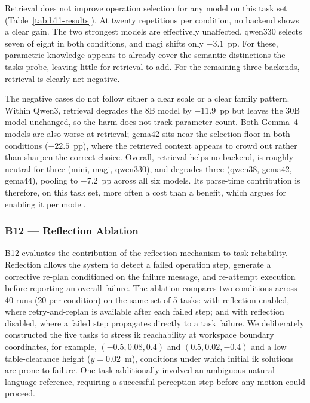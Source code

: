 Retrieval does not improve operation selection for any model on this task set (Table~\ref{tab:b11-results}). At twenty repetitions per condition, no backend shows a clear gain. The two strongest models are effectively unaffected. \gls{qwen330} selects seven of eight in both conditions, and \gls{magi} shifts only $-3.1$~pp. For these, parametric knowledge appears to already cover the semantic distinctions the tasks probe, leaving little for retrieval to add. For the remaining three backends, retrieval is clearly net negative.

The negative cases do not follow either a clear scale or a clear family pattern. Within Qwen3, retrieval degrades the 8B model by $-11.9$~pp but leaves the 30B model unchanged, so the harm does not track parameter count. Both Gemma~4 models are also worse at retrieval; \gls{gema42} sits near the selection floor in both conditions ($-22.5$~pp), where the retrieved context appears to crowd out rather than sharpen the correct choice. Overall, retrieval helps no backend, is roughly neutral for three (\gls{mini}, \gls{magi}, \gls{qwen330}), and degrades three (\gls{qwen38}, \gls{gema42}, \gls{gema44}), pooling to $-7.2$~pp across all six models. Its parse-time contribution is therefore, on this task set, more often a cost than a benefit, which argues for enabling it per model.

\subsubsection{B12 — Reflection Ablation}\label{sec:results-reflection}
B12 evaluates the contribution of the reflection mechanism to task reliability. Reflection allows the system to detect a failed operation step, generate a corrective re-plan conditioned on the failure message, and re-attempt execution before reporting an overall failure. The ablation compares two conditions across 40 runs (20 per condition) on the same set of 5 tasks: with reflection enabled, where retry-and-replan is available after each failed step; and with reflection disabled, where a failed step propagates directly to a task failure. We deliberately constructed the five tasks to stress \gls{ik} reachability at workspace boundary coordinates, for example, $(-0.5, 0.08, 0.4)$ and $(0.5, 0.02, -0.4)$ and a low table-clearance height ($y = 0.02$~m), conditions under which initial \gls{ik} solutions are prone to failure. One task additionally involved an ambiguous natural-language reference, requiring a successful perception step before any motion could proceed.

